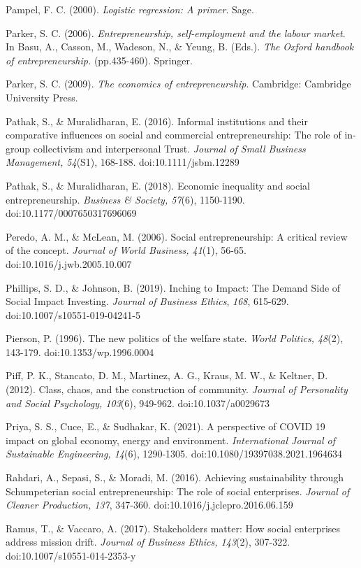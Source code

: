 \documentclass{article}
\begin{document}
Pampel, F. C. (2000). \emph{Logistic regression: A primer}. Sage.

Parker, S. C. (2006). \emph{Entrepreneurship, self-employment and the labour market}. In Basu, A., Casson, M., Wadeson, N., \& Yeung, B. (Eds.). \emph{The} \emph{Oxford handbook of entrepreneurship. }(pp.435-460). Springer. 

Parker, S. C. (2009). \emph{The economics of entrepreneurship}. Cambridge: Cambridge University Press.

Pathak, S., \& Muralidharan, E. (2016). Informal institutions and their comparative influences on social and commercial entrepreneurship: The role of in-group collectivism and interpersonal Trust. \emph{Journal of Small Business Management, 54}(S1), 168-188. doi:10.1111/jsbm.12289

Pathak, S., \& Muralidharan, E. (2018). Economic inequality and social entrepreneurship. \emph{Business \& Society, 57}(6), 1150-1190. doi:10.1177/0007650317696069

Peredo, A. M., \& McLean, M. (2006). Social entrepreneurship: A critical review of the concept. \emph{Journal of World Business, 41}(1), 56-65. doi:10.1016/j.jwb.2005.10.007

Phillips, S. D., \& Johnson, B. (2019). Inching to Impact: The Demand Side of Social Impact Investing. \emph{Journal of Business Ethics}, \emph{168}, 615-629. doi:10.1007/s10551-019-04241-5

Pierson, P. (1996). The new politics of the welfare state. \emph{World Politics, 48}(2), 143-179. doi:10.1353/wp.1996.0004

Piff, P. K., Stancato, D. M., Martinez, A. G., Kraus, M. W., \& Keltner, D. (2012). Class, chaos, and the construction of community. \emph{Journal of Personality and Social Psychology, 103}(6), 949-962. doi:10.1037/a0029673

Priya, S. S., Cuce, E., \& Sudhakar, K. (2021). A perspective of COVID 19 impact on global economy, energy and environment. \emph{International Journal of Sustainable Engineering, 14}(6), 1290-1305. doi:10.1080/19397038.2021.1964634

Rahdari, A., Sepasi, S., \& Moradi, M. (2016). Achieving sustainability through Schumpeterian social entrepreneurship: The role of social enterprises. \emph{Journal of Cleaner Production, 137}, 347-360. doi:10.1016/j.jclepro.2016.06.159

Ramus, T., \& Vaccaro, A. (2017). Stakeholders matter: How social enterprises address mission drift. \emph{Journal of Business Ethics, 143}(2), 307-322. doi:10.1007/s10551-014-2353-y
\end{document}
